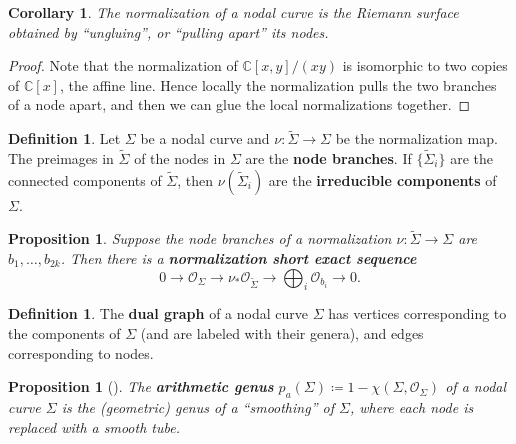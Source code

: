 \documentclass{report}
\theoremstyle{plain}
\newtheorem{proposition}[theorem]{Proposition}
\newtheorem{corollary}[theorem]{Corollary}
\theoremstyle{definition}
\newtheorem{definition}[theorem]{Definition}
\theoremstyle{remark}
\newcommand{\bC}{\mathbb{C}}
\newcommand{\cO}{\mathcal{O}}
\begin{document}
\begin{corollary}
  The normalization of a nodal curve is the Riemann surface obtained
  by ``ungluing'', or ``pulling apart'' its nodes.
\end{corollary}

\begin{proof}
  Note that the normalization of $\bC[x,y]/(xy)$ is isomorphic to two
  copies of $\bC[x]$, the affine line. Hence locally the normalization
  pulls the two branches of a node apart, and then we can glue the
  local normalizations together.
\end{proof}

\begin{definition}
  Let $\Sigma$ be a nodal curve and $\nu\colon\tilde\Sigma \to \Sigma$
  be the normalization map. The preimages in $\tilde{\Sigma}$ of the
  nodes in $\Sigma$ are the {\bf node branches}. If
  $\{\tilde\Sigma_i\}$ are the connected components of $\tilde\Sigma$,
  then $\nu(\tilde\Sigma_i)$ are the {\bf irreducible components} of
  $\Sigma$.
\end{definition}

\begin{proposition}{{\cite[Exercise IV.1.8]{Hartshorne1997}}}
  Suppose the node branches of a normalization $\nu\colon \tilde\Sigma
  \to \Sigma$ are $b_1, \ldots, b_{2k}$. Then there is a {\bf
    normalization short exact sequence}
  \begin{equation} \label{eq:normalization-exact-sequence}
    0 \to \cO_\Sigma \to \nu_*\cO_{\tilde\Sigma} \to \bigoplus_i \cO_{b_i} \to 0.
  \end{equation}
\end{proposition}

\begin{definition} \label{def:dual-graph-nodal-curve}
  The {\bf dual graph} of a nodal curve $\Sigma$ has vertices
  corresponding to the components of $\Sigma$ (and are labeled with
  their genera), and edges corresponding to nodes.
\end{definition}

\begin{proposition}[{\cite[Corollary V.5.6]{Hartshorne1997}}] \label{thm:nodal-curve-arithmetic-genus}
  The {\bf arithmetic genus} $p_a(\Sigma) \coloneqq 1 - \chi(\Sigma,
  \cO_\Sigma)$ of a nodal curve $\Sigma$ is the (geometric) genus of a
  ``smoothing'' of $\Sigma$, where each node is replaced with a smooth
  tube.
\end{proposition}
\end{document}
